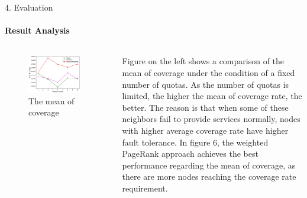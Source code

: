 \documentclass{beamer}		%
\begin{document}
\begin{frame}{4. Evaluation}
\framesubtitle{Result Analysis}
\begin{columns}
\begin{figure}
    \centering
    \includegraphics[width=0.9\textwidth]{Figure6.png}
    \caption{The mean of coverage}
\end{figure}
Figure on the left shows a comparison of the mean of coverage under the condition of a fixed number of quotas. As the number of quotas is limited, the higher the mean of coverage rate, the better. The reason is that when some of these neighbors fail to provide services normally, nodes with higher average coverage rate have higher fault tolerance. In figure 6, the weighted PageRank approach achieves the best performance regarding the mean of coverage, as there are more nodes reaching the coverage rate requirement.
\end{columns}
\end{frame}
\end{document}

